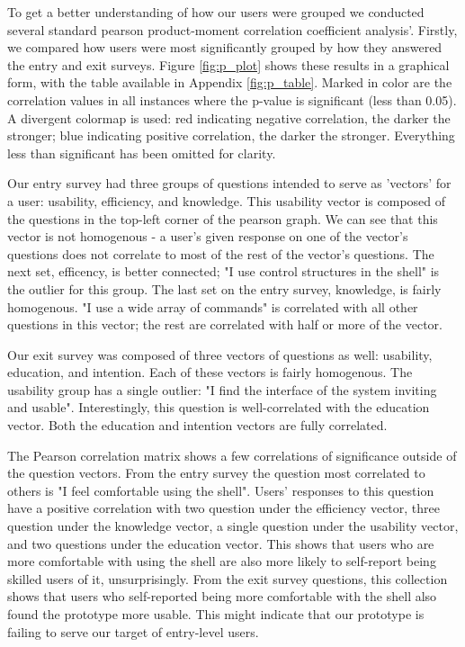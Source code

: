 To get a better understanding of how our users were grouped we conducted several
standard pearson product-moment correlation coefficient analysis'. Firstly, we
compared how users were most significantly grouped by how they answered the
entry and exit surveys. Figure \ref{fig:p_plot} shows these results in a
graphical form, with the table available in Appendix \ref{fig:p_table}. Marked
in color are the correlation values in all instances where the p-value is
significant (less than 0.05). A divergent colormap is used: red indicating
negative correlation, the darker the stronger; blue indicating positive
correlation, the darker the stronger. Everything less than significant has been
omitted for clarity.

Our entry survey had three groups of questions intended to serve as 'vectors'
for a user: usability, efficiency, and knowledge. This usability vector is
composed of the questions in the top-left corner of the pearson graph. We can
see that this vector is not homogenous -  a user's given response on one of the
vector's questions does not correlate to most of the rest of the vector's
questions. The next set, efficency, is better connected; "I use control
structures in the shell" is the outlier for this group. The last set on the
entry survey, knowledge, is fairly homogenous. "I use a wide array of commands"
is correlated with all other questions in this vector; the rest are correlated
with half or more of the vector.

Our exit survey was composed of three vectors of questions as well: usability,
education, and intention. Each of these vectors is fairly homogenous. The
usability group has a single outlier: "I find the interface of the system
inviting and usable". Interestingly, this question is well-correlated with the
education vector. Both the education and intention vectors are fully correlated.

The Pearson correlation matrix shows a few correlations of significance outside
of the question vectors.  From the entry survey the question most correlated to
others is "I feel comfortable using the shell". Users' responses to this question
have a positive correlation with two question under the efficiency vector, three
question under the knowledge vector, a single question under the usability
vector, and two questions under the education vector. This shows that users who
are more comfortable with using the shell are also more likely to self-report
being skilled users of it, unsurprisingly. From the exit survey questions, this
collection shows that users who self-reported being more comfortable with the
shell also found the prototype more usable. This might indicate that our
prototype is failing to serve our target of entry-level users.

